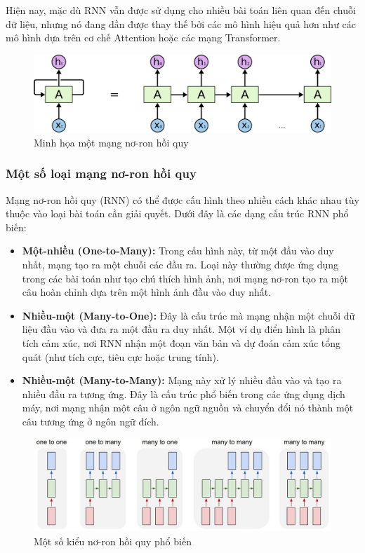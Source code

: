 \indent Hiện nay, mặc dù RNN vẫn được sử dụng cho nhiều bài toán liên quan đến chuỗi dữ liệu, nhưng nó đang dần được thay thế bởi các mô hình hiệu quả hơn như các mô hình dựa trên cơ chế Attention hoặc các mạng Transformer.
\begin{figure}[H]
    \centering
    \includegraphics[width=\textwidth,height=\textheight,keepaspectratio]{Images/Theoretical basis/RNN-unrolled.png}
    \caption{Minh họa một mạng nơ-ron hồi quy}
    \label{fig:enter-label}
\end{figure}

\subsubsection{Một số loại mạng nơ-ron hồi quy}
\indent Mạng nơ-ron hồi quy (RNN) có thể được cấu hình theo nhiều cách khác nhau tùy thuộc vào loại bài toán cần giải quyết. Dưới đây là các dạng cấu trúc RNN phổ biến:
\begin{itemize}
    \item \textbf{Một-nhiều (One-to-Many):} Trong cấu hình này, từ một đầu vào duy nhất, mạng tạo ra một chuỗi các đầu ra. Loại này thường được ứng dụng trong các bài toán như tạo chú thích hình ảnh, nơi mạng nơ-ron tạo ra một câu hoàn chỉnh dựa trên một hình ảnh đầu vào duy nhất.
    \item \textbf{Nhiều-một (Many-to-One):} Đây là cấu trúc mà mạng nhận một chuỗi dữ liệu đầu vào và đưa ra một đầu ra duy nhất. Một ví dụ điển hình là phân tích cảm xúc, nơi RNN nhận một đoạn văn bản và dự đoán cảm xúc tổng quát (như tích cực, tiêu cực hoặc trung tính).
    \item \textbf{Nhiều-một (Many-to-Many):} Mạng này xử lý nhiều đầu vào và tạo ra nhiều đầu ra tương ứng. Đây là cấu trúc phổ biến trong các ứng dụng dịch máy, nơi mạng nhận một câu ở ngôn ngữ nguồn và chuyển đổi nó thành một câu tương ứng ở ngôn ngữ đích.
\end{itemize}

\begin{figure}[H]
    \centering
    \includegraphics[width=\textwidth,height=\textheight,keepaspectratio]{Images/Theoretical basis/RNN_Type.jpeg}
    \caption{Một số kiểu nơ-ron hồi quy phổ biến}
    \label{fig:enter-label}
\end{figure}

